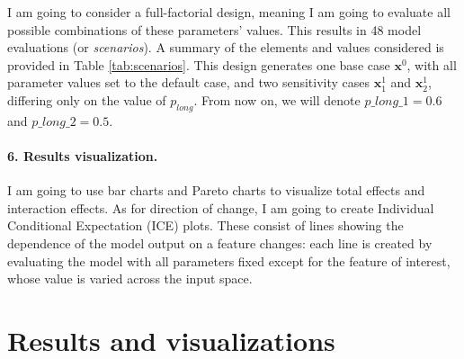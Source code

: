 I am going to consider a full-factorial design, meaning I am going to evaluate all possible combinations of these parameters' values. This results in 48 model evaluations (or \textit{scenarios}). A summary of the elements and values considered is provided in Table \ref{tab:scenarios}. This design generates one base case $\textbf{x}^0$, with all parameter values set to the default case, and two sensitivity cases $\textbf{x}_1^1$ and $\textbf{x}_2^1$, differing only on the value of $p_{long}$. From now on, we will denote $p\_long\_1 = 0.6$ and $p\_long\_2 = 0.5$. 


\begin{table}
    \centering
    \caption{Inputs and values considered for the sensitivity analysis.}
    \label{tab:scenarios}
\end{table}




\paragraph{6. Results visualization.}
I am going to use bar charts and Pareto charts to visualize total effects and interaction effects. As for direction of change, I am going to create Individual Conditional Expectation (ICE) plots. These consist of lines showing the dependence of the model output on a feature changes: each line is created by evaluating the model with all parameters fixed except for the feature of interest, whose value is varied across the input space.



\section{Results and visualizations} \label{sec:ch4_res}

